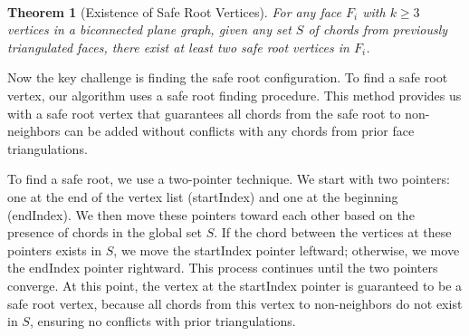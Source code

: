 ﻿﻿\documentclass[12pt,a4paper]{article}
\newtheorem{theorem}{Theorem}
\theoremstyle{definition}
\theoremstyle{remark}
\begin{document}
\begin{theorem}[Existence of Safe Root Vertices]
	\label{thm:safe_root_exists}
	For any face $F_i$ with $k \geq 3$ vertices in a biconnected plane graph, given any set $S$ of chords from previously triangulated faces, there exist at least two safe root vertices in $F_i$.
\end{theorem}

Now the key challenge is finding the safe root configuration. To find a safe root vertex, our algorithm uses a safe root finding procedure. This method provides us with a safe root vertex that guarantees all chords from the safe root to non-neighbors can be added without conflicts with any chords from prior face triangulations.

To find a safe root, we use a two-pointer technique. We start with two pointers: one at the end of the vertex list (startIndex) and one at the beginning (endIndex). We then move these pointers toward each other based on the presence of chords in the global set $S$. If the chord between the vertices at these pointers exists in $S$, we move the startIndex pointer leftward; otherwise, we move the endIndex pointer rightward. This process continues until the two pointers converge. At this point, the vertex at the startIndex pointer is guaranteed to be a safe root vertex, because all chords from this vertex to non-neighbors do not exist in $S$, ensuring no conflicts with prior triangulations.
\end{document}

